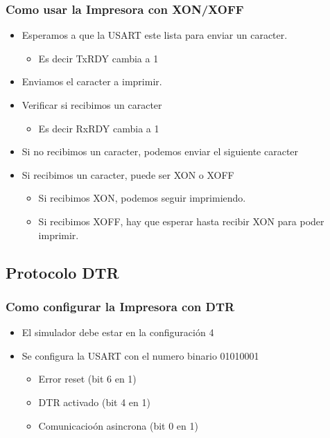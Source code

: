 \documentclass{beamer}
\begin{document}
\begin{frame}[fragile]
\frametitle{Como usar la Impresora con XON/XOFF}

\begin{itemize}
\item Esperamos a que la USART este lista para enviar un caracter. 
\begin{itemize}
\item Es decir TxRDY cambia a 1 
\end{itemize}
\item Enviamos el caracter a imprimir. 
\item Verificar si recibimos un caracter
\begin{itemize}
 \item Es decir RxRDY cambia a 1
\end{itemize}
\item Si no recibimos un caracter, podemos enviar el siguiente caracter
\item Si recibimos un caracter, puede ser XON o XOFF
\begin{itemize}
\item Si recibimos XON, podemos seguir imprimiendo.
\item Si recibimos XOFF, hay que esperar hasta recibir XON para poder imprimir.
\end{itemize}
\end{itemize}

\end{frame}


\subsection{Protocolo DTR}
\begin{frame}[fragile]
\frametitle{Como configurar la Impresora con DTR}
\begin{itemize}
 \item El simulador debe estar en la configuración 4
 \item Se configura la USART con el numero binario 01010001
 \begin{itemize}
 \item Error reset (bit 6 en 1)
 \item DTR activado (bit 4 en 1)
 \item Comunicacioón asincrona (bit 0 en 1)
\end{itemize}
\end{itemize}

\end{frame}
\end{document}
